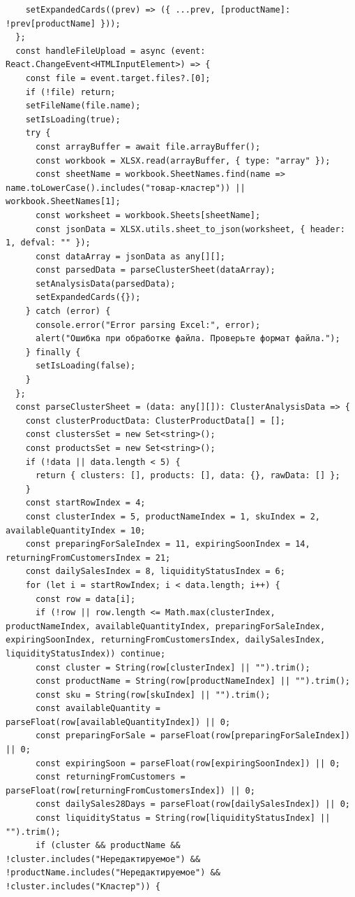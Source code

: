 \begin{code}
\begin{verbatim}
    setExpandedCards((prev) => ({ ...prev, [productName]: !prev[productName] }));
  };
  const handleFileUpload = async (event: React.ChangeEvent<HTMLInputElement>) => {
    const file = event.target.files?.[0];
    if (!file) return;
    setFileName(file.name);
    setIsLoading(true);
    try {
      const arrayBuffer = await file.arrayBuffer();
      const workbook = XLSX.read(arrayBuffer, { type: "array" });
      const sheetName = workbook.SheetNames.find(name => name.toLowerCase().includes("товар-кластер")) || workbook.SheetNames[1];
      const worksheet = workbook.Sheets[sheetName];
      const jsonData = XLSX.utils.sheet_to_json(worksheet, { header: 1, defval: "" });
      const dataArray = jsonData as any[][];
      const parsedData = parseClusterSheet(dataArray);
      setAnalysisData(parsedData);
      setExpandedCards({});
    } catch (error) {
      console.error("Error parsing Excel:", error);
      alert("Ошибка при обработке файла. Проверьте формат файла.");
    } finally {
      setIsLoading(false);
    }
  };
  const parseClusterSheet = (data: any[][]): ClusterAnalysisData => {
    const clusterProductData: ClusterProductData[] = [];
    const clustersSet = new Set<string>();
    const productsSet = new Set<string>();
    if (!data || data.length < 5) {
      return { clusters: [], products: [], data: {}, rawData: [] };
    }
    const startRowIndex = 4;
    const clusterIndex = 5, productNameIndex = 1, skuIndex = 2, availableQuantityIndex = 10;
    const preparingForSaleIndex = 11, expiringSoonIndex = 14, returningFromCustomersIndex = 21;
    const dailySalesIndex = 8, liquidityStatusIndex = 6;
    for (let i = startRowIndex; i < data.length; i++) {
      const row = data[i];
      if (!row || row.length <= Math.max(clusterIndex, productNameIndex, availableQuantityIndex, preparingForSaleIndex, expiringSoonIndex, returningFromCustomersIndex, dailySalesIndex, liquidityStatusIndex)) continue;
      const cluster = String(row[clusterIndex] || "").trim();
      const productName = String(row[productNameIndex] || "").trim();
      const sku = String(row[skuIndex] || "").trim();
      const availableQuantity = parseFloat(row[availableQuantityIndex]) || 0;
      const preparingForSale = parseFloat(row[preparingForSaleIndex]) || 0;
      const expiringSoon = parseFloat(row[expiringSoonIndex]) || 0;
      const returningFromCustomers = parseFloat(row[returningFromCustomersIndex]) || 0;
      const dailySales28Days = parseFloat(row[dailySalesIndex]) || 0;
      const liquidityStatus = String(row[liquidityStatusIndex] || "").trim();
      if (cluster && productName && !cluster.includes("Нередактируемое") && !productName.includes("Нередактируемое") && !cluster.includes("Кластер")) {

\end{verbatim}
\end{code}
